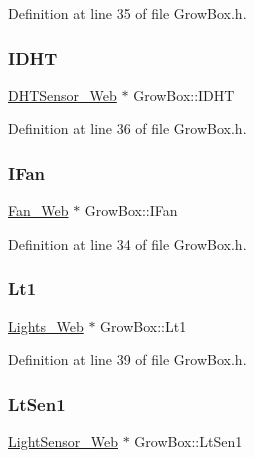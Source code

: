 Definition at line 35 of file Grow\+Box.\+h.

\mbox{\label{class_grow_box_a43f0777043fe13fd07f832d0436d5cdb}} 
\subsubsection{\texorpdfstring{I\+D\+HT}{IDHT}}
{\footnotesize\ttfamily \hyperlink{class_d_h_t_sensor___web}{D\+H\+T\+Sensor\+\_\+\+Web} $\ast$ Grow\+Box\+::\+I\+D\+HT}



Definition at line 36 of file Grow\+Box.\+h.

\mbox{\label{class_grow_box_aff731b9674e2160eaaba3f047db04dd2}} 
\subsubsection{\texorpdfstring{I\+Fan}{IFan}}
{\footnotesize\ttfamily \hyperlink{class_fan___web}{Fan\+\_\+\+Web} $\ast$ Grow\+Box\+::\+I\+Fan}



Definition at line 34 of file Grow\+Box.\+h.

\mbox{\label{class_grow_box_a0e999ef8584ed7f2d385ad8755a55af0}} 
\subsubsection{\texorpdfstring{Lt1}{Lt1}}
{\footnotesize\ttfamily \hyperlink{class_lights___web}{Lights\+\_\+\+Web} $\ast$ Grow\+Box\+::\+Lt1}



Definition at line 39 of file Grow\+Box.\+h.

\mbox{\label{class_grow_box_a28d76d5cbf31d6b2599462beb3c5a73b}} 
\subsubsection{\texorpdfstring{Lt\+Sen1}{LtSen1}}
{\footnotesize\ttfamily \hyperlink{class_light_sensor___web}{Light\+Sensor\+\_\+\+Web} $\ast$ Grow\+Box\+::\+Lt\+Sen1}



